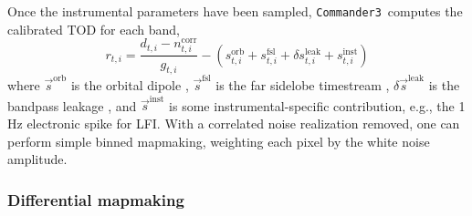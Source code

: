 \documentclass[twocolumn]{../../common/aa}
\def\commanderthree{\texttt{Commander3}}
\newcommand{\s}[0]{\vec{s}}
\begin{document}
Once the instrumental parameters have been sampled, \commanderthree\ computes the calibrated TOD for each band,
\begin{equation}
	r_{t,i}=\frac{d_{t,i}-n_{t,i}^\mathrm{corr}}{g_{t,i}}-\left(s_{t,i}^\mathrm{orb}
	+s_{t,i}^\mathrm{fsl}+\delta s_{t,i}^\mathrm{leak}+{s}_{t,i}^\mathrm{inst}\right)
	\label{eq:caltod}
\end{equation}
where $\s^\mathrm{orb}$ is the orbital dipole \citep{bp07}, $\s^\mathrm{fsl}$ is the far sidelobe timestream \citep{bp08}, $\delta\s^\mathrm{leak}$ is the bandpass leakage \citep{bp09}, and $\s^\mathrm{inst}$ is some instrumental-specific contribution, e.g., the 1\,Hz electronic spike for LFI. With a correlated noise realization removed, one can perform simple binned mapmaking, weighting each pixel by the white noise amplitude.





\subsubsection{Differential mapmaking}
\label{ssec:mapmaking}
\end{document}
